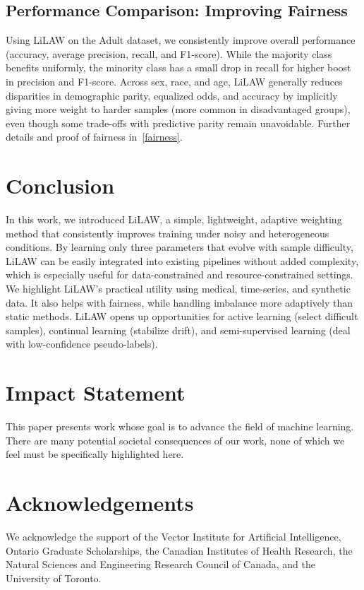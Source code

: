 \documentclass{article}
\theoremstyle{plain}
\theoremstyle{definition}
\theoremstyle{remark}
\begin{document}
\subsection{Performance Comparison: Improving Fairness}
\label{sec:fairness}

Using LiLAW on the Adult dataset, we consistently improve overall performance (accuracy, average precision, recall, and F1-score). While the majority class benefits uniformly, the minority class has a small drop in recall for higher boost in precision and F1-score. Across sex, race, and age, LiLAW generally reduces disparities in demographic parity, equalized odds, and accuracy by implicitly giving more weight to harder samples (more common in disadvantaged groups), even though some trade-offs with predictive parity remain unavoidable. Further details and proof of fairness in~\ref{fairness}.
\vspace{-0.5em}
\section{Conclusion}
\label{sec:conclusion}
In this work, we introduced LiLAW, a simple, lightweight, adaptive weighting method that consistently improves training under noisy and heterogeneous conditions. By learning only three parameters that evolve with sample difficulty, LiLAW can be easily integrated into existing pipelines without added complexity, which is especially useful for data-constrained and resource-constrained settings. We highlight LiLAW's practical utility using medical, time-series, and synthetic data. It also helps with fairness, while handling imbalance more adaptively than static methods. LiLAW opens up opportunities for active learning (select difficult samples), continual learning (stabilize drift), and semi-supervised learning (deal with low-confidence pseudo-labels). 

\newpage

\section*{Impact Statement}
This paper presents work whose goal is to advance the field of machine learning. There are many potential societal consequences of our work, none of which we feel must be specifically highlighted here.

\section*{Acknowledgements}
We acknowledge the support of the Vector Institute for Artificial Intelligence, Ontario Graduate Scholarships, the Canadian Institutes of Health Research, the Natural Sciences and Engineering Research Council of Canada, and the University of Toronto.
\end{document}
